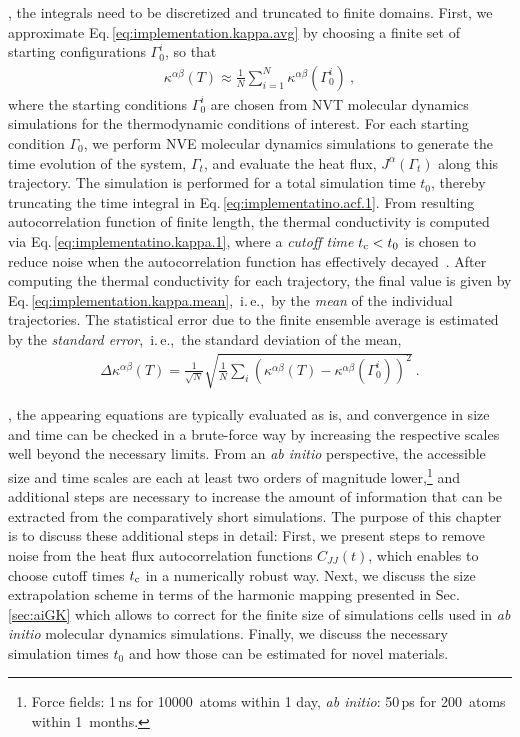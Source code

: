 , the integrals need to be discretized and truncated to finite domains. First, we approximate Eq.\,\eqref{eq:implementation.kappa.avg} by choosing a finite set of starting configurations $\Gamma_0^i$, so that
\begin{align}
	\kappa^{\alpha \beta} (T)
		\approx
		\frac{1}{N} \sum_{i=1}^N \kappa^{\alpha \beta} (\Gamma_0^i)~,
	\label{eq:implementation.kappa.mean}
\end{align}
where the starting conditions $\Gamma_0^i$ are chosen from NVT molecular dynamics simulations for the thermodynamic conditions of interest. For each starting condition $\Gamma_0$, we perform NVE molecular dynamics simulations to generate the time evolution of the system, $\Gamma_t$, and evaluate the heat flux, $J^\alpha (\Gamma_t)$ along this trajectory. The simulation is performed for a total simulation time $t_0$, thereby truncating the time integral in Eq.\,\eqref{eq:implementatino.acf.1}. From resulting autocorrelation function of finite length, the thermal conductivity is computed via Eq.\,\eqref{eq:implementatino.kappa.1}, where a \emph{cutoff time} $t_{\rm c} < t_0$ is chosen to reduce noise when the autocorrelation function has effectively decayed~\cite{Jones2012}.
After computing the thermal conductivity for each trajectory, the final value is given by Eq.\,\eqref{eq:implementation.kappa.mean},~i.\,e.,~by the \emph{mean} of the individual trajectories. The statistical error due to the finite ensemble average is estimated by the \emph{standard error},~i.\,e.,~the standard deviation of the mean,
\begin{align}
	\Delta \kappa^{\alpha \beta} (T)
		= \frac{1}{\sqrt{N}} \sqrt{\frac{1}{N} \sum_i \left( \kappa^{\alpha \beta} (T) - \kappa^{\alpha \beta} (\Gamma_0^i) \right)^2}~.
	\label{eq:imp.kappa.err}
\end{align}




, the appearing equations are typically evaluated as is, and convergence in size and time can be checked in a brute-force way by increasing the respective scales well beyond the necessary limits. From an \emph{ab initio} perspective, the accessible size and time scales are each at least two orders of magnitude lower,\footnote{Force fields: 1\,ns for 10000~atoms within 1 day, \emph{ab initio}: 50\,ps for 200~atoms within 1~months.} and additional steps are necessary to increase the amount of information that can be extracted from the comparatively short simulations. The purpose of this chapter is to discuss these additional steps in detail: First, we present steps to remove noise from the heat flux autocorrelation functions $C_{JJ} (t)$, which enables to choose cutoff times $t_{\rm c}$ in a numerically robust way. Next, we discuss the size extrapolation scheme in terms of the harmonic mapping presented in Sec.\,\ref{sec:aiGK} which allows to correct for the finite size of simulations cells used in \emph{ab initio} molecular dynamics simulations. Finally, we discuss the necessary simulation times $t_0$ and how those can be estimated for novel materials.

